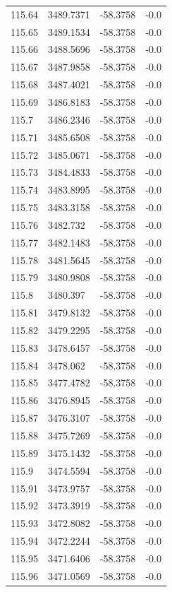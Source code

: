 \begin{table}[H]
\begin{tabular}{llll}
115.64 & 3489.7371 & -58.3758 & -0.0 \\
115.65 & 3489.1534 & -58.3758 & -0.0 \\
115.66 & 3488.5696 & -58.3758 & -0.0 \\
115.67 & 3487.9858 & -58.3758 & -0.0 \\
115.68 & 3487.4021 & -58.3758 & -0.0 \\
115.69 & 3486.8183 & -58.3758 & -0.0 \\
115.7 & 3486.2346 & -58.3758 & -0.0 \\
115.71 & 3485.6508 & -58.3758 & -0.0 \\
115.72 & 3485.0671 & -58.3758 & -0.0 \\
115.73 & 3484.4833 & -58.3758 & -0.0 \\
115.74 & 3483.8995 & -58.3758 & -0.0 \\
115.75 & 3483.3158 & -58.3758 & -0.0 \\
115.76 & 3482.732 & -58.3758 & -0.0 \\
115.77 & 3482.1483 & -58.3758 & -0.0 \\
115.78 & 3481.5645 & -58.3758 & -0.0 \\
115.79 & 3480.9808 & -58.3758 & -0.0 \\
115.8 & 3480.397 & -58.3758 & -0.0 \\
115.81 & 3479.8132 & -58.3758 & -0.0 \\
115.82 & 3479.2295 & -58.3758 & -0.0 \\
115.83 & 3478.6457 & -58.3758 & -0.0 \\
115.84 & 3478.062 & -58.3758 & -0.0 \\
115.85 & 3477.4782 & -58.3758 & -0.0 \\
115.86 & 3476.8945 & -58.3758 & -0.0 \\
115.87 & 3476.3107 & -58.3758 & -0.0 \\
115.88 & 3475.7269 & -58.3758 & -0.0 \\
115.89 & 3475.1432 & -58.3758 & -0.0 \\
115.9 & 3474.5594 & -58.3758 & -0.0 \\
115.91 & 3473.9757 & -58.3758 & -0.0 \\
115.92 & 3473.3919 & -58.3758 & -0.0 \\
115.93 & 3472.8082 & -58.3758 & -0.0 \\
115.94 & 3472.2244 & -58.3758 & -0.0 \\
115.95 & 3471.6406 & -58.3758 & -0.0 \\
115.96 & 3471.0569 & -58.3758 & -0.0 \\

\end{tabular}
\end{table}
